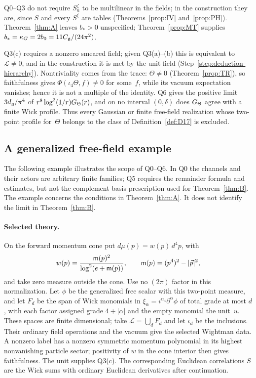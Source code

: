 Q0--Q3 do not require $S_n^\zeta$ to be multilinear in the fields; in the construction they are, since $S$ and every $S^\xi$ are tables (Theorems~\ref{prop:IV} and~\ref{prop:PH}). Theorem~\ref{thm:A} leaves $b_*>0$ unspecified; Theorem~\ref{prop:MT} supplies $b_*=\kappa_G=2b_0=11C_{\mathfrak{g}}/(24\pi^2)$.

\begin{remark}[Nontriviality]\label{rem:nontriviality}
Q3(c) requires a nonzero smeared field; given Q3(a)--(b) this is equivalent to $\mathcal L\ne0$, and in the construction it is met by the unit field (Step~\ref{step:deduction-hierarchy}). Nontriviality comes from the trace: $\Theta\ne0$ (Theorem~\ref{prop:TR}), so faithfulness gives $\Phi(\iota_4\Theta,f)\ne0$ for some~$f$, while its vacuum expectation vanishes; hence it is not a multiple of the identity. Q6 gives the positive limit $3d_{\mathfrak{g}}/\pi^4$ of $r^8\log^2(1/r)G_{\Theta}(r)$, and on no interval $(0,\delta)$ does $G_{\Theta}$ agree with a finite Wick profile. Thus every Gaussian or finite free-field realization whose two-point profile for~$\Theta$ belongs to the class of Definition~\ref{def:D17} is excluded.
\end{remark}

\subsection{A generalized free-field example}\label{sec:public-witness}

The following example illustrates the scope of Q0--Q6. In Q0 the channels and their actors are arbitrary finite families; Q5 requires the remainder formula and estimates, but not the complement-basis prescription used for Theorem~\ref{thm:B}. The example concerns the conditions in Theorem~\ref{thm:A}. It does not identify the limit in Theorem~\ref{thm:B}.

\paragraph{Selected theory.} On the forward momentum cone put $d\mu(p)=w(p)\,d^4p$, with
\begin{equation*}
w(p)=\frac{\mathsf{m}(p)^2}{\log^2(e+\mathsf{m}(p))},\qquad \mathsf{m}(p)=(p^4)^2-|\vec p|^2,
\end{equation*}
and take zero measure outside the cone. Use no $(2\pi)$ factor in this normalization. Let $\phi$ be the generalized free scalar with this two-point measure, and let $F_d$ be the span of Wick monomials in $\xi_\alpha=i^{\alpha_4}\partial^\alpha\phi$ of total grade at most $d$, with each factor assigned grade $4+|\alpha|$ and the empty monomial the unit~$u$. These spaces are finite dimensional; take $\mathcal L=\bigcup_dF_d$ and let $\iota_d$ be the inclusions. Their ordinary field operations and the vacuum give the selected Wightman data. A nonzero label has a nonzero symmetric momentum polynomial in its highest nonvanishing particle sector; positivity of $w$ in the cone interior then gives faithfulness. The unit supplies Q3(c). The corresponding Euclidean correlations $S$ are the Wick sums with ordinary Euclidean derivatives after continuation.

